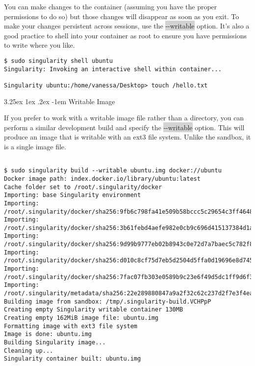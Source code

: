 \documentclass[a4paper]{article}
\makeatletter
\renewcommand\paragraph{\@startsection{paragraph}{5}{\z@}%
  {3.25ex \@plus1ex \@minus.2ex}%
  {-1em}%
  {\normalfont\normalsize\bfseries}}
\makeatother
\begin{document}
		You can make changes to the container (assuming you have the proper permissions to do so) but those changes will disappear as soon as you exit. To make your changes persistent across sessions, use the \colorbox{lightgray}{-{}-writable} option. It’s also a good practice to shell into your container as root to ensure you have permissions to write where you like.\\
		
\begin{lstlisting}[frame=single]  
$ sudo singularity shell ubuntu
Singularity: Invoking an interactive shell within container...

Singularity ubuntu:/home/vanessa/Desktop> touch /hello.txt

\end{lstlisting}		
	
		\paragraph{Writable Image}
		
		If you prefer to work with a writable image file rather than a directory, you can perform a similar development build and specify the \colorbox{lightgray}{-{}-writable} option. This will produce an image that is writable with an ext3 file system. Unlike the sandbox, it is a single image file.

\begin{lstlisting}[frame=single]  

$ sudo singularity build --writable ubuntu.img docker://ubuntu
Docker image path: index.docker.io/library/ubuntu:latest
Cache folder set to /root/.singularity/docker
Importing: base Singularity environment
Importing: /root/.singularity/docker/sha256:9fb6c798fa41e509b58bccc5c29654c3ff4648b608f5daa67c1aab6a7d02c118.tar.gz
Importing: /root/.singularity/docker/sha256:3b61febd4aefe982e0cb9c696d415137384d1a01052b50a85aae46439e15e49a.tar.gz
Importing: /root/.singularity/docker/sha256:9d99b9777eb02b8943c0e72d7a7baec5c782f8fd976825c9d3fb48b3101aacc2.tar.gz
Importing: /root/.singularity/docker/sha256:d010c8cf75d7eb5d2504d5ffa0d19696e8d745a457dd8d28ec6dd41d3763617e.tar.gz
Importing: /root/.singularity/docker/sha256:7fac07fb303e0589b9c23e6f49d5dc1ff9d6f3c8c88cabe768b430bdb47f03a9.tar.gz
Importing: /root/.singularity/metadata/sha256:22e289880847a9a2f32c62c237d2f7e3f4eae7259bf1d5c7ec7ffa19c1a483c8.tar.gz
Building image from sandbox: /tmp/.singularity-build.VCHPpP
Creating empty Singularity writable container 130MB
Creating empty 162MiB image file: ubuntu.img
Formatting image with ext3 file system
Image is done: ubuntu.img
Building Singularity image...
Cleaning up...
Singularity container built: ubuntu.img

\end{lstlisting}
\end{document}
